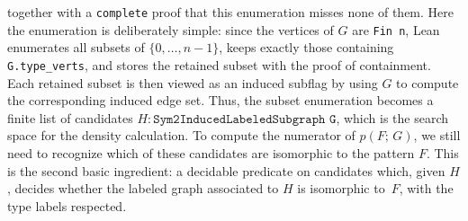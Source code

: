 \documentclass{article}
\newcommand{\den}[2]{p(#1;\,#2)}
\newcommand{\lean}[1]{\texttt{#1}}
\begin{document}
together with a \lean{complete} proof that this enumeration misses none of
them.  Here the
enumeration is deliberately simple: since the vertices of \(G\) are
\lean{Fin n}, Lean enumerates all subsets of \(\{0,\ldots,n-1\}\), keeps
exactly those containing \lean{G.type\_verts}, and stores the retained subset
with the proof of containment.  Each retained subset is then viewed as an
induced subflag by using \(G\) to compute the corresponding induced edge set.
Thus, the subset enumeration becomes a finite list of candidates
\(H : \lean{Sym2InducedLabeledSubgraph G}\), which is the search space for the
density calculation.  To compute the numerator of \(\den{F}{G}\), we still need
to recognize which of these candidates are isomorphic to the pattern \(F\).
This is the second basic ingredient: a decidable predicate on candidates which,
given \(H\), decides whether the labeled graph associated to \(H\) is
isomorphic to~\(F\), with the type labels respected.
\end{document}
